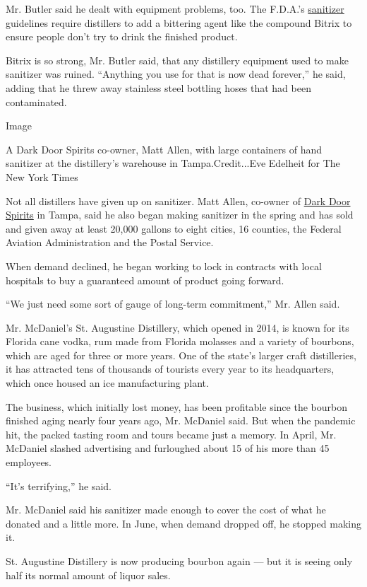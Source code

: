 Mr. Butler said he dealt with equipment problems, too. The F.D.A.'s
\href{https://www.fda.gov/media/136118/download}{sanitizer} guidelines
require distillers to add a bittering agent like the compound Bitrix to
ensure people don't try to drink the finished product.

Bitrix is so strong, Mr. Butler said, that any distillery equipment used
to make sanitizer was ruined. ``Anything you use for that is now dead
forever,'' he said, adding that he threw away stainless steel bottling
hoses that had been contaminated.

Image

A Dark Door Spirits co-owner, Matt Allen, with large containers of hand
sanitizer at the distillery's warehouse in Tampa.Credit...Eve Edelheit
for The New York Times

Not all distillers have given up on sanitizer. Matt Allen, co-owner of
\href{http://darkdoorspirits.com/}{Dark Door Spirits} in Tampa, said he
also began making sanitizer in the spring and has sold and given away at
least 20,000 gallons to eight cities, 16 counties, the Federal Aviation
Administration and the Postal Service.

When demand declined, he began working to lock in contracts with local
hospitals to buy a guaranteed amount of product going forward.

``We just need some sort of gauge of long-term commitment,'' Mr. Allen
said.

Mr. McDaniel's St. Augustine Distillery, which opened in 2014, is known
for its Florida cane vodka, rum made from Florida molasses and a variety
of bourbons, which are aged for three or more years. One of the state's
larger craft distilleries, it has attracted tens of thousands of
tourists every year to its headquarters, which once housed an ice
manufacturing plant.

The business, which initially lost money, has been profitable since the
bourbon finished aging nearly four years ago, Mr. McDaniel said. But
when the pandemic hit, the packed tasting room and tours became just a
memory. In April, Mr. McDaniel slashed advertising and furloughed about
15 of his more than 45 employees.

``It's terrifying,'' he said.

Mr. McDaniel said his sanitizer made enough to cover the cost of what he
donated and a little more. In June, when demand dropped off, he stopped
making it.

St. Augustine Distillery is now producing bourbon again --- but it is
seeing only half its normal amount of liquor sales.

